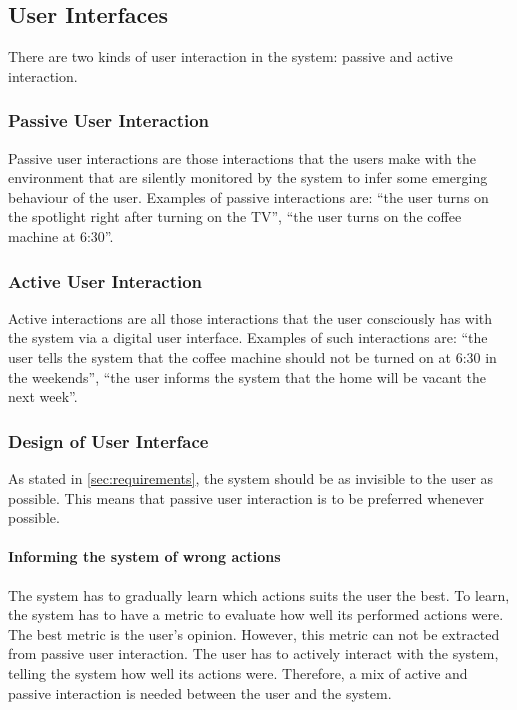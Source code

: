 \subsection{User Interfaces}
There are two kinds of user interaction in the system: passive and active interaction.

\subsubsection{Passive User Interaction}
Passive user interactions are those interactions that the users make with the environment that are silently monitored by the system to infer some emerging behaviour of the user. Examples of passive interactions are: \enquote{the user turns on the spotlight right after turning on the TV}, \enquote{the user turns on the coffee machine at 6:30}.

\subsubsection{Active User Interaction}
Active interactions are all those interactions that the user consciously has with the system via a digital user interface. Examples of such interactions are: \enquote{the user tells the system that the coffee machine should not be turned on at 6:30 in the weekends}, \enquote{the user informs the system that the home will be vacant the next week}.

\subsubsection{Design of User Interface}
As stated in \cref{sec:requirements}, the system should be as invisible to the user as possible. This means that passive user interaction is to be preferred whenever possible. 

\paragraph{Informing the system of wrong actions}

The system has to gradually learn which actions suits the user the best. To learn, the system has to have a metric to evaluate how well its performed actions were. The best metric is the user's opinion. However, this metric can not be extracted from passive user interaction. The user has to actively interact with the system, telling the system how well its actions were. Therefore, a mix of active and passive interaction is needed between the user and the system.

